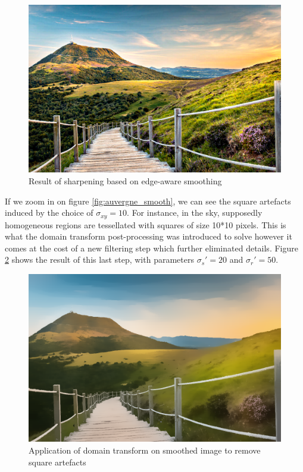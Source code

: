 \documentclass{article}
\begin{document}
\begin{figure}
    \centering
    \includegraphics[width=12cm]{../code/results/smoothing_auvergne_sharp.png}
    \caption{Result of sharpening based on edge-aware smoothing}
    \label{fig:auvergne_sharp}
\end{figure}

If we zoom in on figure \ref{fig:auvergne_smooth}, we can see the square artefacts induced by the choice of $\sigma_{xy} = 10$. For instance, in the sky, supposedly homogeneous regions are tessellated with squares of size 10*10 pixels. This is what the domain transform post-processing was introduced to solve however it comes at the cost of a new filtering step which further eliminated details. Figure \ref{fig:auvergne_DT} shows the result of this last step, with parameters $\sigma_s' = 20$ and $\sigma_r' = 50$.

\begin{figure}
    \centering
    \includegraphics[width=12cm]{../code/results/smoothing_auvergne_DT_new.png}
    \caption{Application of domain transform on smoothed image to remove square artefacts}
    \label{fig:auvergne_DT}
\end{figure}
\end{document}
